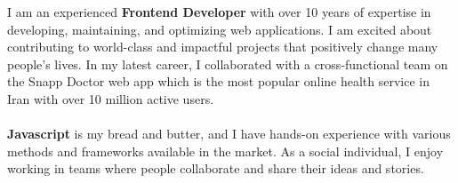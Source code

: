 \documentclass[8pt]{developercv} %
\begin{document}
    \begin{minipage}[t]{0.5\textwidth}
        \vspace{-6pt}

        I am an experienced \textbf{Frontend Developer} with over 10 years of expertise in developing, maintaining, and optimizing web applications.
        I am excited about contributing to world-class and impactful projects that positively change many people’s lives.
        In my latest career, I collaborated with a cross-functional team on the Snapp Doctor web app which is the most popular online health service in Iran with over 10 million active users.
        \\
        \\
        \textbf{Javascript} is my bread and butter, and I have hands-on experience with various methods and frameworks available in the market.
        As a social individual, I enjoy working in teams where people collaborate and share their ideas and stories.

    \end{minipage}
    \hfill %
\end{document}
